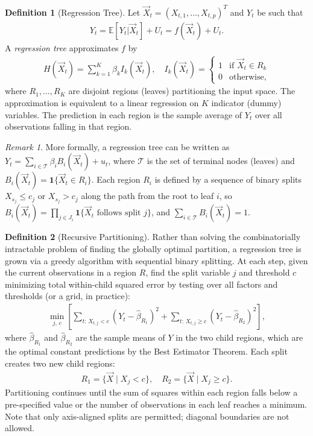 \documentclass[11pt]{article}
\theoremstyle{definition}
\newtheorem{definition}{Definition}[section]
\theoremstyle{plain}
\theoremstyle{remark}
\newtheorem{remark}{Remark}[section]
\begin{document}
\begin{definition}[Regression Tree]
    Let $\vec{X}_t = (X_{t,1},\dots,X_{t,p})^T$ and $Y_t$ be such that
    \begin{align}
        Y_t = \mathbb{E}[Y_t|\vec{X}_t] + U_t = f(\vec{X}_t) + U_t.
    \end{align}
    A \textit{regression tree} approximates $f$ by
    \begin{align}
        H(\vec{X}_t) = \sum_{k=1}^K \beta_k I_k(\vec{X}_t), \quad I_k(\vec{X}_t) = \begin{cases} 1 & \text{if } \vec{X}_t \in R_k \\ 0 & \text{otherwise,} \end{cases}
    \end{align}
    where $R_1,\dots,R_K$ are disjoint regions (leaves) partitioning the input space. The approximation is equivalent to a linear regression on $K$ indicator (dummy) variables. The prediction in each region is the sample average of $Y_t$ over all observations falling in that region.
\end{definition}

\begin{remark}
    More formally, a regression tree can be written as $Y_t = \sum_{i \in \mathcal{T}} \beta_i B_i(\vec{X}_t) + u_t$, where $\mathcal{T}$ is the set of terminal nodes (leaves) and $B_i(\vec{X}_t) = \mathbf{1}\{\vec{X}_t \in R_i\}$. Each region $R_i$ is defined by a sequence of binary splits $X_{s_j} \leq c_j$ or $X_{s_j} > c_j$ along the path from the root to leaf $i$, so $B_i(\vec{X}_t) = \prod_{j \in J_i} \mathbf{1}\{\vec{X}_t \text{ follows split } j\}$, and $\sum_{i \in \mathcal{T}} B_i(\vec{X}_t) = 1$.
\end{remark}

\begin{definition}[Recursive Partitioning]
    Rather than solving the combinatorially intractable problem of finding the globally optimal partition, a regression tree is grown via a greedy algorithm with sequential binary splitting. At each step, given the current observations in a region $R$, find the split variable $j$ and threshold $c$ minimizing total within-child squared error by testing over all factors and thresholds (or a grid, in practice):
    \begin{align}
        \min_{j,\, c} \left[ \sum_{t:\, X_{t,j} < c} (Y_t - \hat{\beta}_{R_1})^2 + \sum_{t:\, X_{t,j} \geq c} (Y_t - \hat{\beta}_{R_2})^2 \right],
    \end{align}
    where $\hat{\beta}_{R_1}$ and $\hat{\beta}_{R_2}$ are the sample means of $Y$ in the two child regions, which are the optimal constant predictions by the Best Estimator Theorem. Each split creates two new child regions:
    \begin{align}
        R_1 = \{\vec{X} \mid X_j < c\}, \quad R_2 = \{\vec{X} \mid X_j \geq c\}.
    \end{align}
    Partitioning continues until the sum of squares within each region falls below a pre-specified value or the number of observations in each leaf reaches a minimum. Note that only axis-aligned splits are permitted; diagonal boundaries are not allowed.
\end{definition}
\end{document}
